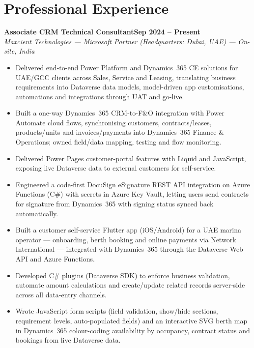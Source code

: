 \documentclass[10pt,a4paper]{article}
\newcommand{\job}[3]{%
  \Needspace{5\baselineskip}%
  \textbf{#1}\hfill\textbf{#2}\\
  \textit{#3}\par\vspace{1pt}
}
\begin{document}
\section*{Professional Experience}
\job{Associate CRM Technical Consultant}{Sep 2024 -- Present}{Maxcient Technologies --- Microsoft Partner (Headquarters: Dubai, UAE) --- On-site, India}
\begin{itemize}
  \item Delivered end-to-end Power Platform and Dynamics~365 CE solutions for UAE/GCC clients across Sales, Service and Leasing, translating business requirements into Dataverse data models, model-driven app customisations, automations and integrations through UAT and go-live.
  \item Built a one-way Dynamics~365 CRM-to-F\&O integration with Power Automate cloud flows, synchronising customers, contracts/leases, products/units and invoices/payments into Dynamics~365 Finance \& Operations; owned field/data mapping, testing and flow monitoring.
  \item Delivered Power Pages customer-portal features with Liquid and JavaScript, exposing live Dataverse data to external customers for self-service.
  \item Engineered a code-first DocuSign eSignature REST API integration on Azure Functions (C\#) with secrets in Azure Key Vault, letting users send contracts for signature from Dynamics~365 with signing status synced back automatically.
  \item Built a customer self-service Flutter app (iOS/Android) for a UAE marina operator --- onboarding, berth booking and online payments via Network International --- integrated with Dynamics~365 through the Dataverse Web API and Azure Functions.
  \item Developed C\# plugins (Dataverse SDK) to enforce business validation, automate amount calculations and create/update related records server-side across all data-entry channels.
  \item Wrote JavaScript form scripts (field validation, show/hide sections, requirement levels, auto-populated fields) and an interactive SVG berth map in Dynamics~365 colour-coding availability by occupancy, contract status and bookings from live Dataverse data.

\end{itemize}
\end{document}
